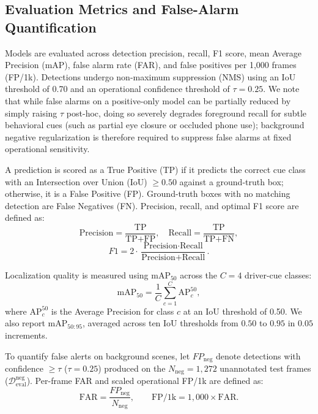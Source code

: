 \documentclass[conference]{IEEEtran}
\begin{document}
\subsection{Evaluation Metrics and False-Alarm Quantification}
\label{subsec:metrics}
Models are evaluated across detection precision, recall, F1 score, mean Average Precision (mAP), false alarm rate (FAR), and false positives per 1,000 frames (FP/1k). Detections undergo non-maximum suppression (NMS) using an IoU threshold of 0.70 and an operational confidence threshold of $\tau = 0.25$. We note that while false alarms on a positive-only model can be partially reduced by simply raising $\tau$ post-hoc, doing so severely degrades foreground recall for subtle behavioral cues (such as partial eye closure or occluded phone use); background negative regularization is therefore required to suppress false alarms at fixed operational sensitivity.

A prediction is scored as a True Positive (TP) if it predicts the correct cue class with an Intersection over Union (IoU) $\ge 0.50$ against a ground-truth box; otherwise, it is a False Positive (FP). Ground-truth boxes with no matching detection are False Negatives (FN). Precision, recall, and optimal F1 score are defined as:
\begin{equation}
\text{Precision} = \frac{\text{TP}}{\text{TP} + \text{FP}}, \quad \text{Recall} = \frac{\text{TP}}{\text{TP} + \text{FN}},
\label{eq:precision_recall}
\end{equation}
\begin{equation}
F1 = 2 \cdot \frac{\text{Precision} \cdot \text{Recall}}{\text{Precision} + \text{Recall}}.
\label{eq:f1}
\end{equation}

Localization quality is measured using $\text{mAP}_{50}$ across the $C = 4$ driver-cue classes:
\begin{equation}
\text{mAP}_{50} = \frac{1}{C} \sum_{c=1}^{C} \text{AP}_c^{50},
\label{eq:map}
\end{equation}
where $\text{AP}_c^{50}$ is the Average Precision for class $c$ at an IoU threshold of 0.50. We also report $\text{mAP}_{50:95}$, averaged across ten IoU thresholds from $0.50$ to $0.95$ in $0.05$ increments.

To quantify false alerts on background scenes, let $FP_{\mathrm{neg}}$ denote detections with confidence $\ge \tau$ ($\tau = 0.25$) produced on the $N_{\mathrm{neg}} = 1{,}272$ unannotated test frames ($\mathcal{D}_{\mathrm{eval}}^{\mathrm{neg}}$). Per-frame FAR and scaled operational FP/1k are defined as:
\begin{equation}
\text{FAR} = \frac{FP_{\mathrm{neg}}}{N_{\mathrm{neg}}}, \qquad \text{FP/1k} = 1{,}000 \times \text{FAR}.
\label{eq:far}
\end{equation}
\end{document}
